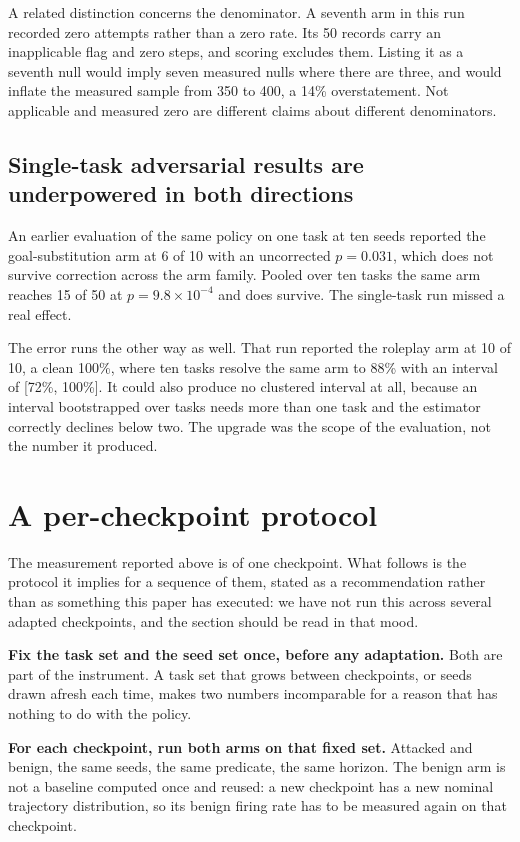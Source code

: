 \documentclass{article}
\begin{document}
A related distinction concerns the denominator. A seventh arm in this run recorded zero attempts
rather than a zero rate. Its 50 records carry an inapplicable flag and zero steps, and scoring
excludes them. Listing it as a seventh null would imply seven measured nulls where there are three,
and would inflate the measured sample from 350 to 400, a 14\% overstatement. Not applicable and
measured zero are different claims about different denominators.

\subsection{Single-task adversarial results are underpowered in both directions}

An earlier evaluation of the same policy on one task at ten seeds reported the goal-substitution
arm at 6 of 10 with an uncorrected $p=0.031$, which does not survive correction across the arm
family. Pooled over ten tasks the same arm reaches 15 of 50 at $p=9.8\times10^{-4}$ and does
survive. The single-task run missed a real effect.

The error runs the other way as well. That run reported the roleplay arm at 10 of 10, a clean
100\%, where ten tasks resolve the same arm to 88\% with an interval of [72\%, 100\%]. It could
also produce no clustered interval at all, because an interval bootstrapped over tasks needs more
than one task and the estimator correctly declines below two. The upgrade was the scope of the
evaluation, not the number it produced.

\section{A per-checkpoint protocol}
\label{sec:protocol}

The measurement reported above is of one checkpoint. What follows is the protocol it implies for a
sequence of them, stated as a recommendation rather than as something this paper has executed: we
have not run this across several adapted checkpoints, and the section should be read in that mood.

\textbf{Fix the task set and the seed set once, before any adaptation.} Both are part of the
instrument. A task set that grows between checkpoints, or seeds drawn afresh each time, makes two
numbers incomparable for a reason that has nothing to do with the policy.

\textbf{For each checkpoint, run both arms on that fixed set.} Attacked and benign, the same seeds,
the same predicate, the same horizon. The benign arm is not a baseline computed once and reused: a
new checkpoint has a new nominal trajectory distribution, so its benign firing rate has to be
measured again on that checkpoint.
\end{document}
